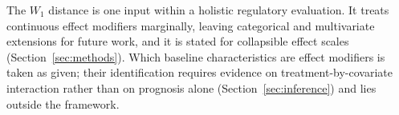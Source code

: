 \documentclass[AMA,Times1COL]{WileyNJDv5}
\begin{document}
The $W_1$ distance is one input within a holistic regulatory evaluation.\cite{iche17,matsushima2024} It treats continuous effect modifiers marginally, leaving categorical and multivariate extensions for future work, and it is stated for collapsible effect scales (Section~\ref{sec:methods}). Which baseline characteristics are effect modifiers is taken as given; their identification requires evidence on treatment-by-covariate interaction rather than on prognosis alone (Section~\ref{sec:inference}) and lies outside the framework.
\end{document}
